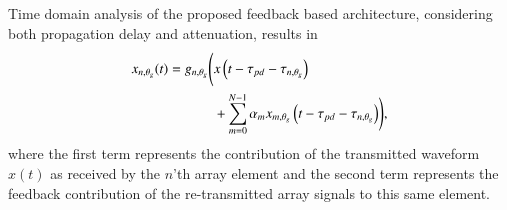 \ifdefined\DEFIncludeAttenuation
    Time domain analysis of the proposed feedback based architecture, considering both propagation delay and attenuation, results in 
    \begin{equation}
        \label{eqn:SingleSensorTemporalEquality}
            \begin{split}
                x_{n,\theta_g}(t) = g_{n,\theta_g}\Bigg{(}&x\rBrace{t-\tau_{pd}-\tau_{n,\theta_g}}\\
                &+\sum_{m=0}^{N-1}{\alpha_{m}x_{m,\theta_g}\rBrace{t-\tau_{pd}-\tau_{n,\theta_g}}}\Bigg{)},
            \end{split}
    \end{equation}
    where the first term represents the contribution of the transmitted waveform $x(t)$ as received by the $n$'th array element and the second term represents the feedback contribution of the re-transmitted array signals to this same element.
    
